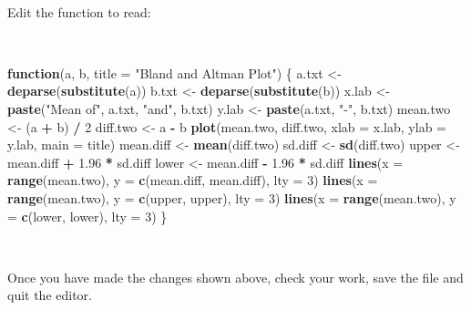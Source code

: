 \documentclass[12pt,a4paper]{book}
\newenvironment{Shaded}{\begin{snugshade}}{\end{snugshade}}
\newcommand{\KeywordTok}[1]{\textcolor[rgb]{0.13,0.29,0.53}{\textbf{#1}}}
\newcommand{\DataTypeTok}[1]{\textcolor[rgb]{0.13,0.29,0.53}{#1}}
\newcommand{\DecValTok}[1]{\textcolor[rgb]{0.00,0.00,0.81}{#1}}
\newcommand{\FloatTok}[1]{\textcolor[rgb]{0.00,0.00,0.81}{#1}}
\newcommand{\StringTok}[1]{\textcolor[rgb]{0.31,0.60,0.02}{#1}}
\newcommand{\ControlFlowTok}[1]{\textcolor[rgb]{0.13,0.29,0.53}{\textbf{#1}}}
\newcommand{\OperatorTok}[1]{\textcolor[rgb]{0.81,0.36,0.00}{\textbf{#1}}}
\newcommand{\NormalTok}[1]{#1}
\theoremstyle{definition}
\theoremstyle{definition}
\theoremstyle{definition}
\theoremstyle{remark}
\begin{document}
~

Edit the function to read:

~

\begin{Shaded}
\begin{Highlighting}[]
\ControlFlowTok{function}\NormalTok{(a, b, }\DataTypeTok{title =} \StringTok{"Bland and Altman Plot"}\NormalTok{) \{}
\NormalTok{  a.txt <-}\StringTok{ }\KeywordTok{deparse}\NormalTok{(}\KeywordTok{substitute}\NormalTok{(a))}
\NormalTok{  b.txt <-}\StringTok{ }\KeywordTok{deparse}\NormalTok{(}\KeywordTok{substitute}\NormalTok{(b))}
\NormalTok{  x.lab <-}\StringTok{ }\KeywordTok{paste}\NormalTok{(}\StringTok{"Mean of"}\NormalTok{, a.txt, }\StringTok{"and"}\NormalTok{, b.txt)}
\NormalTok{  y.lab <-}\StringTok{ }\KeywordTok{paste}\NormalTok{(a.txt, }\StringTok{"-"}\NormalTok{, b.txt)}
\NormalTok{  mean.two <-}\StringTok{ }\NormalTok{(a }\OperatorTok{+}\StringTok{ }\NormalTok{b) }\OperatorTok{/}\StringTok{ }\DecValTok{2}
\NormalTok{  diff.two <-}\StringTok{ }\NormalTok{a }\OperatorTok{-}\StringTok{ }\NormalTok{b}
  \KeywordTok{plot}\NormalTok{(mean.two, diff.two, }\DataTypeTok{xlab =}\NormalTok{ x.lab, }\DataTypeTok{ylab =}\NormalTok{ y.lab, }\DataTypeTok{main =}\NormalTok{ title) }
\NormalTok{  mean.diff <-}\StringTok{ }\KeywordTok{mean}\NormalTok{(diff.two)}
\NormalTok{  sd.diff <-}\StringTok{ }\KeywordTok{sd}\NormalTok{(diff.two)}
\NormalTok{  upper <-}\StringTok{ }\NormalTok{mean.diff }\OperatorTok{+}\StringTok{ }\FloatTok{1.96} \OperatorTok{*}\StringTok{ }\NormalTok{sd.diff}
\NormalTok{  lower <-}\StringTok{ }\NormalTok{mean.diff }\OperatorTok{-}\StringTok{ }\FloatTok{1.96} \OperatorTok{*}\StringTok{ }\NormalTok{sd.diff}
  \KeywordTok{lines}\NormalTok{(}\DataTypeTok{x =} \KeywordTok{range}\NormalTok{(mean.two), }\DataTypeTok{y =} \KeywordTok{c}\NormalTok{(mean.diff, mean.diff), }\DataTypeTok{lty =} \DecValTok{3}\NormalTok{) }
  \KeywordTok{lines}\NormalTok{(}\DataTypeTok{x =} \KeywordTok{range}\NormalTok{(mean.two), }\DataTypeTok{y =} \KeywordTok{c}\NormalTok{(upper, upper), }\DataTypeTok{lty =} \DecValTok{3}\NormalTok{)}
  \KeywordTok{lines}\NormalTok{(}\DataTypeTok{x =} \KeywordTok{range}\NormalTok{(mean.two), }\DataTypeTok{y =} \KeywordTok{c}\NormalTok{(lower, lower), }\DataTypeTok{lty =} \DecValTok{3}\NormalTok{)}
\NormalTok{\}}
\end{Highlighting}
\end{Shaded}

~

Once you have made the changes shown above, check your work, save the
file and quit the editor.
\end{document}
